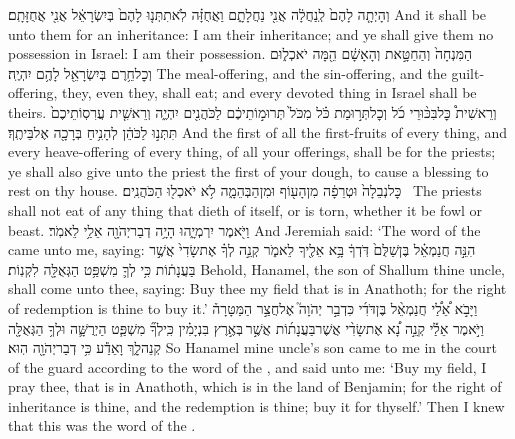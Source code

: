 {וְהָיְתָ֤ה לָהֶם֙ לְֽנַחֲלָ֔ה אֲנִ֖י נַחֲלָתָ֑ם וַאֲחֻזָּ֗ה לֹֽא\maqqaf תִתְּנ֤וּ לָהֶם֙ בְּיִשְׂרָאֵ֔ל אֲנִ֖י אֲחֻזָּתָֽם׃}
{And it shall be unto them for an inheritance: I am their inheritance; and ye shall give them no possession in Israel: I am their possession.}
{הַמִּנְחָה֙ וְהַחַטָּ֣את וְהָאָשָׁ֔ם הֵ֖מָּה יֹאכְל֑וּם וְכׇל\maqqaf חֵ֥רֶם בְּיִשְׂרָאֵ֖ל לָהֶ֥ם יִהְיֶֽה׃}
{The meal-offering, and the sin-offering, and the guilt-offering, they, even they, shall eat; and every devoted thing in Israel shall be theirs.}
{וְרֵאשִׁית֩ כׇּל\maqqaf בִּכּ֨וּרֵי כֹ֜ל וְכׇל\maqqaf תְּר֣וּמַת כֹּ֗ל מִכֹּל֙ תְּרוּמ֣וֹתֵיכֶ֔ם לַכֹּהֲנִ֖ים יִהְיֶ֑ה וְרֵאשִׁ֤ית עֲרִסֽוֹתֵיכֶם֙ תִּתְּנ֣וּ לַכֹּהֵ֔ן לְהָנִ֥יחַ בְּרָכָ֖ה אֶל\maqqaf בֵּיתֶֽךָ׃}
{And the first of all the first-fruits of every thing, and every heave-offering of every thing, of all your offerings, shall be for the priests; ye shall also give unto the priest the first of your dough, to cause a blessing to rest on thy house.}
{כׇּל\maqqaf נְבֵלָה֙ וּטְרֵפָ֔ה מִן\maqqaf הָע֖וֹף וּמִן\maqqaf הַבְּהֵמָ֑ה לֹ֥א יֹאכְל֖וּ הַכֹּהֲנִֽים׃ \petucha }
{The priests shall not eat of any thing that dieth of itself, or is torn, whether it be fowl or beast.}
\label{haft_32}
\setcounter{chap}{32}
\setcounter{verse}{6}
{וַיֹּ֖אמֶר יִרְמְיָ֑הוּ הָיָ֥ה דְבַר\maqqaf יְהֹוָ֖ה אֵלַ֥י לֵאמֹֽר׃}
{And Jeremiah said: ‘The word of the \lord\space came unto me, saying:}
{הִנֵּ֣ה חֲנַמְאֵ֗ל בֶּן\maqqaf שַׁלֻּם֙ דֹּֽדְךָ֔ בָּ֥א אֵלֶ֖יךָ לֵאמֹ֑ר קְנֵ֣ה לְךָ֗ אֶת\maqqaf שָׂדִי֙ אֲשֶׁ֣ר בַּעֲנָת֔וֹת כִּ֥י לְךָ֛ מִשְׁפַּ֥ט הַגְּאֻלָּ֖ה לִקְנֽוֹת׃}
{Behold, Hanamel, the son of Shallum thine uncle, shall come unto thee, saying: Buy thee my field that is in Anathoth; for the right of redemption is thine to buy it.’}
{וַיָּבֹ֣א אֵ֠לַ֠י חֲנַמְאֵ֨ל בֶּן\maqqaf דֹּדִ֜י כִּדְבַ֣ר יְהֹוָה֮ אֶל\maqqaf חֲצַ֣ר הַמַּטָּרָה֒ וַיֹּ֣אמֶר אֵלַ֡י קְנֵ֣ה נָ֠א אֶת\maqqaf שָׂדִ֨י אֲשֶׁר\maqqaf בַּעֲנָת֜וֹת אֲשֶׁ֣ר \legarmeh  בְּאֶ֣רֶץ בִּנְיָמִ֗ין כִּֽי\maqqaf לְךָ֞ מִשְׁפַּ֧ט הַיְרֻשָּׁ֛ה וּלְךָ֥ הַגְּאֻלָּ֖ה קְנֵה\maqqaf לָ֑ךְ וָאֵדַ֕ע כִּ֥י דְבַר\maqqaf יְהֹוָ֖ה הֽוּא׃}
{So Hanamel mine uncle’s son came to me in the court of the guard according to the word of the \lord, and said unto me: ‘Buy my field, I pray thee, that is in Anathoth, which is in the land of Benjamin; for the right of inheritance is thine, and the redemption is thine; buy it for thyself.’ Then I knew that this was the word of the \lord.}
